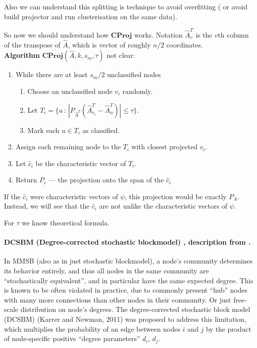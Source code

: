\documentclass{ITaSconf}
\begin{document}
	Also we can understand this splitting is technique to avoid overfitting ( or avoid build projector and run clusterisation on the same data).
	
	So now we should understand how $\mathbf{CProj}$ works. Notation $\hat A^T_v$ is the $v$th column of the transpose of $\hat A$, which is vector of roughly $n/2$ coordinates.\\
	
	\textbf{Algorithm} $\mathbf{CProj}(\hat A, k, s_m, \tau)$ {\color{red} not clear}:
	\begin{enumerate}
		\item While there are at least $s_m / 2$ unclassified nodes
		\begin{enumerate}
			\item Choose an unclassified node $v_i$ randomly.
			\item Let $T_i = \{ u \,: \, |P_{\hat A^T}(\hat A_{v_i}^T - \hat A_{u}^T)| \le  \tau\}$.
			\item Mark each $u \in T_i$ as classified.
		\end{enumerate}
		\item Assign each remaining node to the $T_i$ with closest projected $v_i$.
		\item Let $\hat c_i$ be the characteristic vector of $T_i$.
		\item Return $P_{\hat c}$ --- the projection onto the span of the $\hat c_i$
	\end{enumerate}
	
	If the $\hat c_i$ were characteristic vectors of $\psi$, this projection would be exactly $P_A$. Instead, we will see that the $\hat c_i$ are not unlike the characteristic vectors of $\psi$.
	
	For $\tau$ we know theoretical formula.
	
	\paragraph{DCSBM (Degree-corrected stochastic blockmodel) \cite{karrer2011DCMMSB}, description from \cite{zhang2014OCCAM}.}
	In MMSB (also as in just stochastic blockmodel), a node’s community determines its behavior entirely, and thus all nodes in the same community are “stochastically equivalent”, and in particular have the same expected degree. This is known to be often violated in practice, due to commonly present “hub” nodes with many more connections than other nodes	in their community. Or just free-scale distribution on node's degrees. The degree-corrected stochastic block model (DCSBM) (Karrer and Newman, 2011) was proposed to address this limitation, which multiplies the probability of an edge between	nodes $i$ and $j$ by the product of node-specific positive “degree parameters” $d_i$, $d_j$.
	
\end{document}
